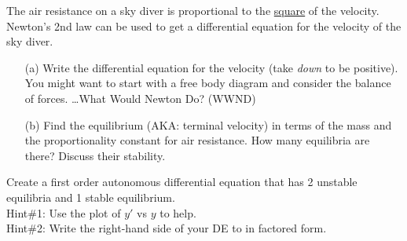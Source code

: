 \begin{problem}
    The air resistance on a sky diver is proportional to the \underline{square} of the velocity.
    Newton's 2nd law can be used to get a differential equation for the velocity of the
    sky diver.
    \begin{enumerate}
        \item [(a)] Write the differential equation for the velocity (take {\it down} to
            be positive).  You might want to start with a free body diagram and consider
            the balance of forces.  \ldots What Would Newton Do? (WWND)
        \item[(b)] Find the equilibrium (AKA: terminal velocity) in terms of the mass and
            the proportionality constant for air resistance. How many equilibria are
            there?  Discuss their stability.
    \end{enumerate}
\end{problem}


\begin{problem}
    Create a first order autonomous differential equation that has 2 unstable equilibria
    and 1 stable equilibrium.\\
    Hint\#1: Use the plot of $y'$ vs $y$ to help.\\
    Hint\#2: Write the right-hand side of your DE to in factored form.
\end{problem}


